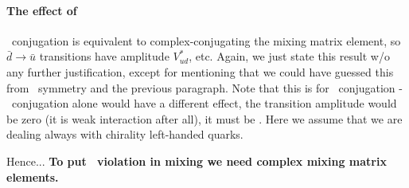 \paragraph{The effect of \cp}
  \cp\ conjugation is equivalent to complex-conjugating the mixing
  matrix element, so $\bar{d} \to \bar{u}$ transitions have amplitude
  $V^{*}_{ud}$, etc. Again, we just state this result w/o any further
  justification, except for mentioning that we could have guessed this
  from \cpt\ symmetry and the previous paragraph. Note that this is
  for \cp\ conjugation - \cs\ conjugation alone would have a different
  effect, the transition amplitude would be zero (it is weak
  interaction after all), it must be \cp. Here we assume that we are
  dealing always with chirality left-handed quarks.

Hence...
\textbf{To put \cp\ violation in mixing we need complex mixing matrix
  elements.}


